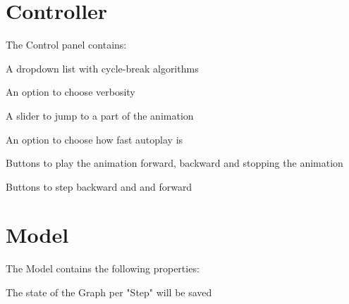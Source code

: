 \section{Controller}
The Control panel contains:
\begin{list}{-}{}
\item A dropdown list with cycle-break algorithms
\item An option to choose verbosity
\item A slider to jump to a part of the animation
\item An option to choose how fast autoplay is
\item Buttons to play the animation forward, backward and stopping the animation
\item Buttons to step backward and and forward

\end{list}


\section{Model}
The Model contains the following properties:
\begin{list}{-}{}
\item The state of the Graph per "Step" will be saved

\end{list}




